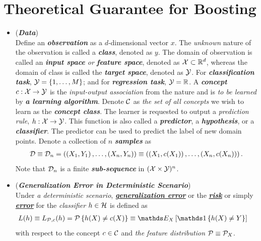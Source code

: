 \documentclass[11pt]{article}
\begin{document}
\section{Theoretical Guarantee for Boosting}
\begin{itemize}
\item \begin{remark} (\emph{\textbf{Data}})\\
Define an \emph{\textbf{observation}} as a $d$-dimensional vector $x$. The \emph{unknown} nature of the observation is called a \emph{\textbf{class}}, denoted as $y$. The domain of observation is called an \emph{\textbf{input space} or \textbf{feature space}}, denoted as ${\mathcal X}\subset {\mathbb R}^{d}$, whereas the domain of class is called the \emph{\textbf{target space}}, denoted as ${\mathcal Y}$. For \emph{\textbf{classification task}}, ${\mathcal Y}= \left\{1,\ldots, M\right\}$; and for \emph{\textbf{regression task}}, ${\mathcal Y} = {\mathbb R}$.   A \emph{\textbf{concept}} $c: {\mathcal X} \rightarrow {\mathcal Y}$ is the \emph{input-output association} from the nature and is \emph{to be learned} by \emph{\textbf{a learning algorithm}}.  Denote ${\mathcal C}$ as \emph{the set of all concepts} we wish to learn as the \emph{\textbf{concept class}}. The learner is requested to output a \emph{prediction rule}, $h : {\mathcal X} \to {\mathcal Y}$. This function is also called a \emph{\textbf{predictor}}, a \emph{\textbf{hypothesis}}, or a \emph{\textbf{classifier}}. The predictor can be used to predict the label of new domain points.  Denote a collection of $n$ \emph{\textbf{samples}} as 
\begin{align*}
{\mathcal D} \equiv {\mathcal D}_n = \left((X_1, Y_1) \,{,}\ldots{,}\, (X_n, Y_n)\right) \equiv  \left((X_1, c(X_1)) \,{,}\ldots{,}\, (X_n, c(X_n))\right) .
\end{align*} Note that ${\mathcal D}_n$ is a finite \emph{\textbf{sub-sequence}} in $({\mathcal X} \times {\mathcal Y})^n$.
\end{remark}

\item \begin{definition} (\emph{\textbf{Generalization Error in Deterministic Scenario}})  \citep{mohri2018foundations}\\
Under \emph{a deterministic scenario}, \underline{\emph{\textbf{generalization error}}} or the \underline{\emph{\textbf{risk}}} or simply \underline{\emph{\textbf{error}}} for the \emph{classifier} $h \in {\mathcal H}$ is defined as
\begin{align}
L(h) \equiv L_{\cP, c}(h)  &= \cP\set{h(X) \neq c(X)} \equiv \E{X}{\ind{h(X)\neq Y}}\label{expr: gen_err_determin}
\end{align}
with respect to the concept $c \in {\mathcal C}$ and \emph{the feature distribution} ${\mathcal P} \equiv {\mathcal P}_X$.
\end{definition}


\end{itemize}
\end{document}
